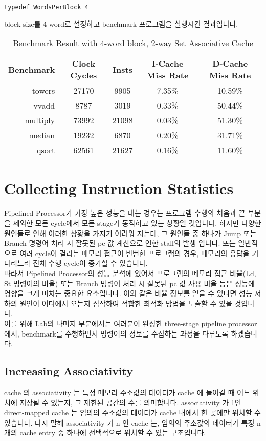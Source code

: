 \documentclass{article}
\begin{document}
\begin{Verbatim}[frame=single]
  typedef WordsPerBlock 4
\end{Verbatim}

\newpage
{} block size를 4-word로 설정하고 benchmark 프로그램을 실행시킨 결과입니다.

\begin{table}[ht]
\centering
\begin{tabular}{|r|c|c|c|c|}
\hline
Benchmark & Clock Cycles & Insts & I-Cache Miss Rate & D-Cache Miss Rate \\
\hline
towers & 27170 & 9905 & 7.35\% & 10.59\%\\
 vvadd & 8787 & 3019 & 0.33\% & 50.44\% \\
multiply & 73992 & 21098 & 0.03\% & 51.30\% \\
  median & 19232 & 6870 & 0.20\% & 31.71\% \\
   qsort & 62561 & 21627 & 0.16\% & 11.60\% \\
\hline
\end{tabular}
\caption{Benchmark Result with 4-word block, 2-way Set Associative Cache}
\end{table}


\section{Collecting Instruction Statistics}
Pipelined Processor가 가장 높은 성능을 내는 경우는 프로그램 수행의 처음과 끝 부분을 제외한 
모든 cycle에서 모든 stage가 동작하고 있는 상황일 것입니다. 하지만 다양한 원인들로 인해 이러한 상황을 가지기 어려워 지는데,
그 원인들 중 하나가 Jump 또는 Branch 명령어 처리 시 잘못된 pc 값 계산으로 인한 stall의 발생 입니다. 또는 일반적으로
여러 cycle이 걸리는 메모리 접근이 빈번한 프로그램의 경우, 메모리의 응답을 기다리느라 전체 수행 cycle이 증가할 수 있습니다.
\\따라서 Pipelined Processor의 성능 분석에 있어서 프로그램의 메모리 접근 비율(Ld, St 명령어의 비율) 또는 Branch 명령어 처리 
시 잘못된 pc 값 사용 비율 등은 성능에 영향을 크게 미치는 중요한 요소입니다. 이와 같은 비율 정보를 얻을 수 있다면 
성능 저하의 원인이 어디에서 오는지 짐작하여 적합한 최적화 방법을 도출할 수 있을 것입니다. 
\\이를 위해 Lab의 나머지 부분에서는 여러분이 완성한 three-stage pipeline processor에서,
benchmark를 수행하면서 명령어의 정보를 수집하는 과정을 다루도록 하겠습니다.

\subsection{Increasing Associativity}
cache 의 associativity 는 특정 메모리 주소값의 데이터가 cache 에 들어갈 때
어느 위치에 저장될 수 있는지, 그 제한된 공간의 수를 의미합니다.
associativity 가 1인 direct-mapped cache 는 임의의 주소값의 데이터가
cache 내에서 한 곳에만 위치할 수 있습니다. 다시 말해 associativity 가 n 인
cache 는, 임의의 주소값의 데이터가 특정 n 개의 cache entry 중 하나에 선택적으로 위치할 수 
있는 구조입니다. 
\end{document}

